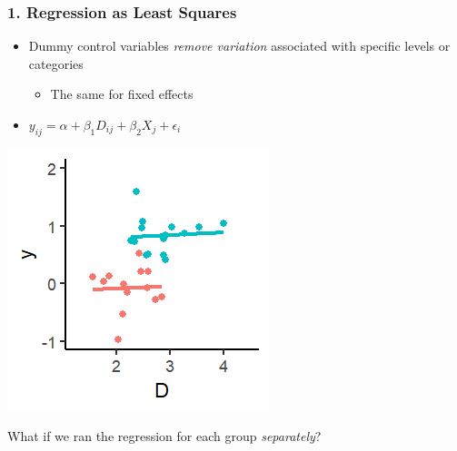 \documentclass[xcolor=x11names,compress]{beamer}\usepackage[]{graphicx}\usepackage[]{color}
\makeatletter
\def\maxwidth{ %
  \ifdim\Gin@nat@width>\linewidth
    \linewidth
  \else
    \Gin@nat@width
  \fi
}
\newenvironment{knitrout}{}{} %
\renewcommand{\(}{\begin{columns}}
\renewcommand{\)}{\end{columns}}
\newcommand{\<}[1]{\begin{column}{#1}}
\renewcommand{\>}{\end{column}}
\makeatother
\begin{document}
\begin{frame}
\frametitle{1. Regression as Least Squares}
\begin{itemize}
\item Dummy control variables \textit{remove variation} associated with specific levels or categories
\begin{itemize}
\item The same for fixed effects
\end{itemize}
\item $y_{ij} = \alpha + \beta_1 D_{ij} + \beta_2 X_j + \epsilon_i$
\end{itemize}
\begin{multicols}{2}
\begin{knitrout}
\color{fgcolor}
\includegraphics[width=\maxwidth]{figure/graph_ols_FE3-1} 

\end{knitrout}
\columnbreak
What if we ran the regression for each group \textit{separately}?
\end{multicols}
\end{frame}
\end{document}
